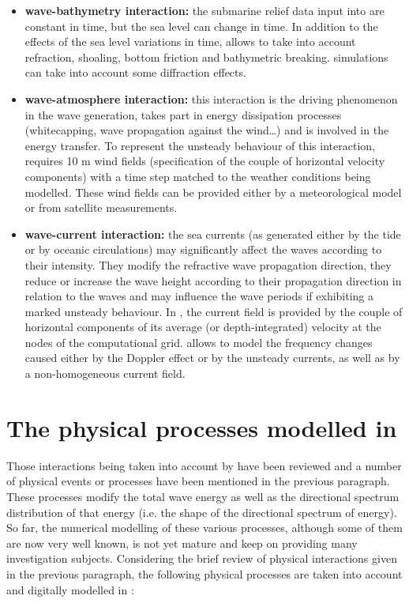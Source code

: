  \begin{itemize}
\item \textbf{wave-bathymetry interaction:} the submarine relief data input into \tomawac are constant in time, but the sea level can change in time. In addition to the effects of the sea level variations in time, \tomawac allows to take into account refraction, shoaling, bottom friction and bathymetric breaking. \tomawac simulations can take into account some diffraction effects.

 \item \textbf{wave-atmosphere interaction:} this interaction is the driving phenomenon in the wave generation, takes part in energy dissipation processes (whitecapping, wave propagation against the wind\dots ) and is involved in the energy transfer. To represent the unsteady behaviour of this interaction, \tomawac requires 10 m wind fields (specification of the couple of horizontal velocity components) with a time step matched to the weather conditions being modelled. These wind fields can be provided either by a meteorological model or from satellite measurements.

 \item \textbf{wave-current interaction:} the sea currents (as generated either by the tide or by oceanic circulations) may significantly affect the waves according to their intensity. They modify the refractive wave propagation direction, they reduce or increase the wave height according to their propagation direction in relation to the waves and may influence the wave periods if exhibiting a marked unsteady behaviour. In \tomawac, the current field is provided by the couple of horizontal components of its average (or depth-integrated) velocity at the nodes of the computational grid. \tomawac allows to model the frequency changes caused either by the Doppler effect or by the unsteady currents, as well as by a non-homogeneous current field.
\end{itemize}


\section{ The physical processes modelled in \tomawac}
\label{se:physicalprocesse}
 Those interactions being taken into account by \tomawac have been reviewed and a number of physical events or processes have been mentioned in the previous paragraph. These processes modify the total wave energy as well as the directional spectrum distribution of that energy (i.e. the shape of the directional spectrum of energy). So far, the numerical modelling of these various processes, although some of them are now very well known, is not yet mature and keep on providing many investigation subjects. Considering the brief review of physical interactions given in the previous paragraph, the following physical processes are taken into account and digitally modelled in \tomawac:

